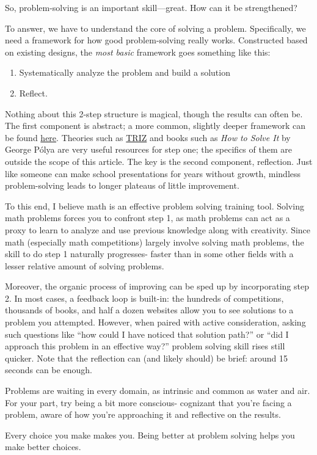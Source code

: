 \documentclass{article}
\begin{document}
So, problem-solving is an important skill—great. How can it be strengthened?

To answer, we have to understand the core of solving a problem. Specifically, we need a framework for how good problem-solving really works. Constructed based on existing designs, the \textit{most basic} framework goes something like this:
\begin{enumerate}
    \item Systematically analyze the problem and build a solution
    \item Reflect.
\end{enumerate}

Nothing about this 2-step structure is magical, though the results can often be. The first component is abstract; a more common, slightly deeper framework can be found \href{https://asq.org/quality-resources/problem-solving}{here}. Theories such as \href{https://en.wikipedia.org/wiki/TRIZ}{TRIZ} and books such as \textit{How to Solve It} by George Pólya are very useful resources for step one; the specifics of them are outside the scope of this article. The key is the second component, reflection. Just like someone can make school presentations for years without growth, mindless problem-solving leads to longer plateaus of little improvement.

To this end, I believe math is an effective problem solving training tool. Solving math problems forces you to confront step 1, as math problems can act as a proxy to learn to analyze and use previous knowledge along with creativity. Since math (especially math competitions) largely involve solving math problems, the skill to do step 1 naturally progresses- faster than in some other fields with a lesser relative amount of solving problems.

Moreover, the organic process of improving can be sped up by incorporating step 2. In most cases, a feedback loop is built-in: the hundreds of competitions, thousands of books, and half a dozen websites allow you to see solutions to a problem you attempted. However, when paired with active consideration, asking such questions like “how could I have noticed that solution path?” or “did I approach this problem in an effective way?” problem solving skill rises still quicker. Note that the reflection can (and likely should) be brief: around 15 seconds can be enough. 

Problems are waiting in every domain, as intrinsic and common as water and air. For your part, try being a bit more conscious- cognizant that you’re facing a problem, aware of how you’re approaching it and reflective on the results.

Every choice you make makes you. Being better at problem solving helps you make better choices.
\end{document}
